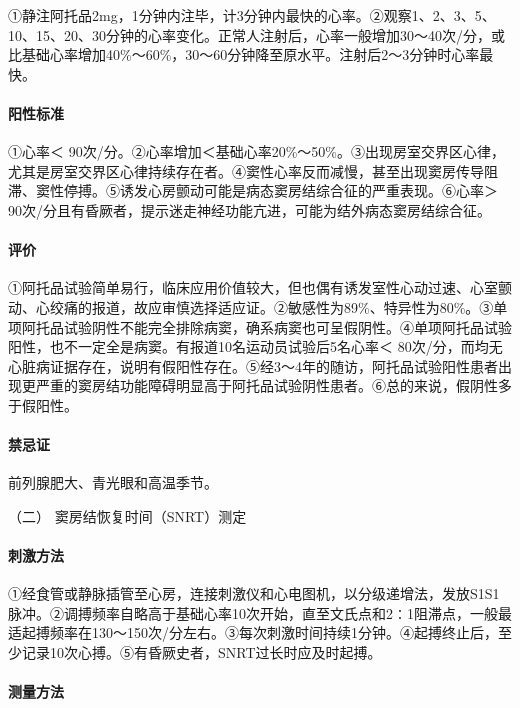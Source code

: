 ①静注阿托品2mg，1分钟内注毕，计3分钟内最快的心率。②观察1、2、3、5、10、15、20、30分钟的心率变化。正常人注射后，心率一般增加30～40次/分，或比基础心率增加40\%～60\%，30～60分钟降至原水平。注射后2～3分钟时心率最快。

\paragraph{阳性标准}

①心率＜
90次/分。②心率增加＜基础心率20\%～50\%。③出现房室交界区心律，尤其是房室交界区心律持续存在者。④窦性心率反而减慢，甚至出现窦房传导阻滞、窦性停搏。⑤诱发心房颤动可能是病态窦房结综合征的严重表现。⑥心率＞
90次/分且有昏厥者，提示迷走神经功能亢进，可能为结外病态窦房结综合征。

\paragraph{评价}

①阿托品试验简单易行，临床应用价值较大，但也偶有诱发室性心动过速、心室颤动、心绞痛的报道，故应审慎选择适应证。②敏感性为89\%、特异性为80\%。③单项阿托品试验阴性不能完全排除病窦，确系病窦也可呈假阴性。④单项阿托品试验阳性，也不一定全是病窦。有报道10名运动员试验后5名心率＜
80次/分，而均无心脏病证据存在，说明有假阳性存在。⑤经3～4年的随访，阿托品试验阳性患者出现更严重的窦房结功能障碍明显高于阿托品试验阴性患者。⑥总的来说，假阴性多于假阳性。

\paragraph{禁忌证}

前列腺肥大、青光眼和高温季节。

\hypertarget{text00298.htmlux5cux23CHP10-2-11-3-4-2}{}
（二） 窦房结恢复时间（SNRT）测定

\paragraph{刺激方法}

①经食管或静脉插管至心房，连接刺激仪和心电图机，以分级递增法，发放S1S1脉冲。②调搏频率自略高于基础心率10次开始，直至文氏点和2∶1阻滞点，一般最适起搏频率在130～150次/分左右。③每次刺激时间持续1分钟。④起搏终止后，至少记录10次心搏。⑤有昏厥史者，SNRT过长时应及时起搏。

\paragraph{测量方法}

